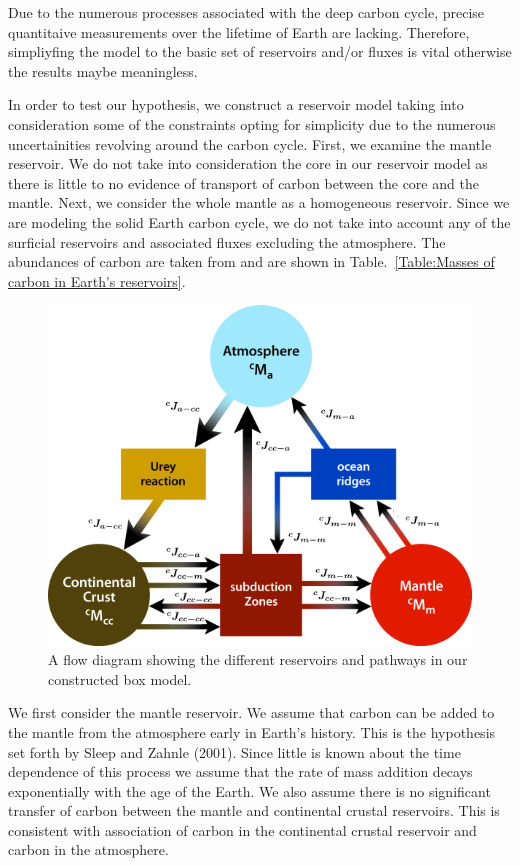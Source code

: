 Due to the numerous processes associated with the deep carbon cycle, precise quantitaive measurements over the lifetime of Earth are lacking. Therefore, simpliyfing the model to the basic set of reservoirs and/or fluxes is vital otherwise the results maybe meaningless. 

In order to test our hypothesis, we construct a reservoir model taking into consideration some of the constraints opting for simplicity due to the numerous uncertainities revolving around the carbon cycle. First, we examine the mantle reservoir. We do not take into consideration the core in our reservoir model as there is little to no evidence of transport of carbon between the core and the mantle. Next, we consider the whole mantle as a homogeneous reservoir. Since we are modeling the solid Earth carbon cycle, we do not take into account any of the surficial reservoirs and associated fluxes excluding the atmosphere. The abundances of carbon are taken from \citet{KLH-TDL-WM:2017} and are shown in Table.~\ref{Table:Masses of carbon in Earth's reservoirs}.

\begin{figure}
  \centering
  \includegraphics[scale=0.5]{Figures/RelabelJaniceFlowDiagram.png}
  \caption{A flow diagram showing the different reservoirs and pathways in our constructed box model.}
  \label{ReservoirFlowDiagram}
\end{figure}


We first consider the mantle reservoir. We assume that carbon can be added to the mantle from the atmosphere early in Earth's history. This is the hypothesis set forth by Sleep and Zahnle (2001). Since little is known about the time dependence of this process we assume that the rate of mass addition decays exponentially with the age of the Earth. We also assume there is no significant transfer of carbon between the mantle and continental crustal reservoirs. This is consistent with association of carbon in the continental crustal reservoir and carbon in the atmosphere.

